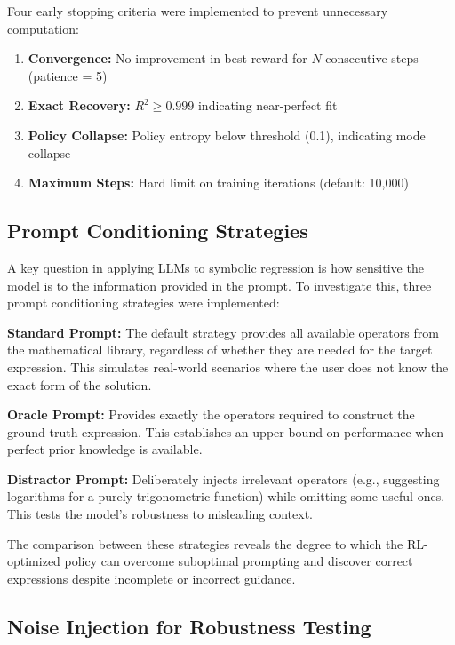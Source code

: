 Four early stopping criteria were implemented to prevent unnecessary computation:

\begin{enumerate}
    \item \textbf{Convergence:} No improvement in best reward for $N$ consecutive steps (patience = 5)
    \item \textbf{Exact Recovery:} $R^2 \geq 0.999$ indicating near-perfect fit
    \item \textbf{Policy Collapse:} Policy entropy below threshold (0.1), indicating mode collapse
    \item \textbf{Maximum Steps:} Hard limit on training iterations (default: 10,000)
\end{enumerate}

\subsection{Prompt Conditioning Strategies}
\label{sec:prompt_conditioning}

A key question in applying LLMs to symbolic regression is how sensitive the model is to the information provided in the prompt. To investigate this, three prompt conditioning strategies were implemented:

\textbf{Standard Prompt:} The default strategy provides all available operators from the mathematical library, regardless of whether they are needed for the target expression. This simulates real-world scenarios where the user does not know the exact form of the solution.

\textbf{Oracle Prompt:} Provides exactly the operators required to construct the ground-truth expression. This establishes an upper bound on performance when perfect prior knowledge is available.

\textbf{Distractor Prompt:} Deliberately injects irrelevant operators (e.g., suggesting logarithms for a purely trigonometric function) while omitting some useful ones. This tests the model's robustness to misleading context.

The comparison between these strategies reveals the degree to which the RL-optimized policy can overcome suboptimal prompting and discover correct expressions despite incomplete or incorrect guidance.

\subsection{Noise Injection for Robustness Testing}
\label{sec:noise_injection}

